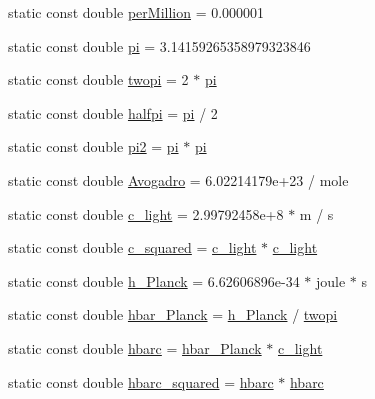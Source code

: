 \begin{DoxyCompactItemize}
\item 
static const double \hyperlink{namespacedd4hep_a3c86fbb277949a5ee64673266d8f9f93}{perMillion} = 0.000001
\item 
static const double \hyperlink{namespacedd4hep_ae71f82066d68af053eb8f60d0e13d3af}{pi} = 3.14159265358979323846
\item 
static const double \hyperlink{namespacedd4hep_ae89c0c70c74b5fd0c1972865846822d7}{twopi} = 2 $\ast$ \hyperlink{namespacedd4hep_ae71f82066d68af053eb8f60d0e13d3af}{pi}
\item 
static const double \hyperlink{namespacedd4hep_a6681c641778caec7c8626e0d666a1be7}{halfpi} = \hyperlink{namespacedd4hep_ae71f82066d68af053eb8f60d0e13d3af}{pi} / 2
\item 
static const double \hyperlink{namespacedd4hep_a5cf56ca6631717191746c4f24418d5f3}{pi2} = \hyperlink{namespacedd4hep_ae71f82066d68af053eb8f60d0e13d3af}{pi} $\ast$ \hyperlink{namespacedd4hep_ae71f82066d68af053eb8f60d0e13d3af}{pi}
\item 
static const double \hyperlink{namespacedd4hep_a674bc3e17add397df97b4b8222ad8a1e}{Avogadro} = 6.02214179e+23 / mole
\item 
static const double \hyperlink{namespacedd4hep_abab5bebb73a5c3123d23fba7c326a0d5}{c\_\-light} = 2.99792458e+8 $\ast$ m / s
\item 
static const double \hyperlink{namespacedd4hep_a1501a5f994e55104b62b1907ff652300}{c\_\-squared} = \hyperlink{namespacedd4hep_abab5bebb73a5c3123d23fba7c326a0d5}{c\_\-light} $\ast$ \hyperlink{namespacedd4hep_abab5bebb73a5c3123d23fba7c326a0d5}{c\_\-light}
\item 
static const double \hyperlink{namespacedd4hep_a673d90bb18d025dec577177927fac9f0}{h\_\-Planck} = 6.62606896e-\/34 $\ast$ joule $\ast$ s
\item 
static const double \hyperlink{namespacedd4hep_abb25342c5e225d62446e9546e412bdcf}{hbar\_\-Planck} = \hyperlink{namespacedd4hep_a673d90bb18d025dec577177927fac9f0}{h\_\-Planck} / \hyperlink{namespacedd4hep_ae89c0c70c74b5fd0c1972865846822d7}{twopi}
\item 
static const double \hyperlink{namespacedd4hep_aee6340c5f86bb7ae1edcc2a90efa056e}{hbarc} = \hyperlink{namespacedd4hep_abb25342c5e225d62446e9546e412bdcf}{hbar\_\-Planck} $\ast$ \hyperlink{namespacedd4hep_abab5bebb73a5c3123d23fba7c326a0d5}{c\_\-light}
\item 
static const double \hyperlink{namespacedd4hep_acf9f3f7006e079db9d63413e8c861d94}{hbarc\_\-squared} = \hyperlink{namespacedd4hep_aee6340c5f86bb7ae1edcc2a90efa056e}{hbarc} $\ast$ \hyperlink{namespacedd4hep_aee6340c5f86bb7ae1edcc2a90efa056e}{hbarc}

\end{DoxyCompactItemize}
